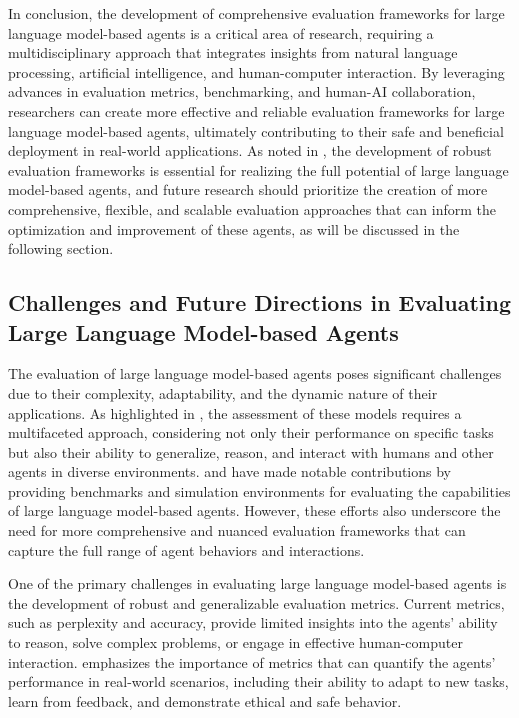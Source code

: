 \documentclass[11pt,a4paper]{article}
\begin{document}
In conclusion, the development of comprehensive evaluation frameworks for large language model-based agents is a critical area of research, requiring a multidisciplinary approach that integrates insights from natural language processing, artificial intelligence, and human-computer interaction. By leveraging advances in evaluation metrics, benchmarking, and human-AI collaboration, researchers can create more effective and reliable evaluation frameworks for large language model-based agents, ultimately contributing to their safe and beneficial deployment in real-world applications. As noted in \cite{arxiv:2501.11354}, the development of robust evaluation frameworks is essential for realizing the full potential of large language model-based agents, and future research should prioritize the creation of more comprehensive, flexible, and scalable evaluation approaches that can inform the optimization and improvement of these agents, as will be discussed in the following section.


\subsection{Challenges and Future Directions in Evaluating Large Language Model-based Agents}


The evaluation of large language model-based agents poses significant challenges due to their complexity, adaptability, and the dynamic nature of their applications. As highlighted in \cite{doi:10.1145/3641289}, the assessment of these models requires a multifaceted approach, considering not only their performance on specific tasks but also their ability to generalize, reason, and interact with humans and other agents in diverse environments. \cite{arxiv:2308.03688} and \cite{arxiv:2308.04026} have made notable contributions by providing benchmarks and simulation environments for evaluating the capabilities of large language model-based agents. However, these efforts also underscore the need for more comprehensive and nuanced evaluation frameworks that can capture the full range of agent behaviors and interactions.

One of the primary challenges in evaluating large language model-based agents is the development of robust and generalizable evaluation metrics. Current metrics, such as perplexity and accuracy, provide limited insights into the agents' ability to reason, solve complex problems, or engage in effective human-computer interaction. \cite{arxiv:2404.09135} emphasizes the importance of metrics that can quantify the agents' performance in real-world scenarios, including their ability to adapt to new tasks, learn from feedback, and demonstrate ethical and safe behavior. 
\end{document}
